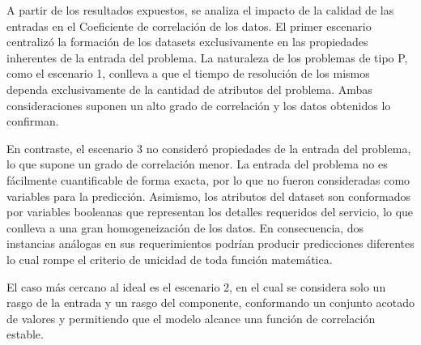A partir de los resultados expuestos, se analiza el impacto de la
calidad de las entradas en el Coeficiente de correlación de los datos.
El primer escenario centralizó la formación de los datasets exclusivamente
en las propiedades inherentes de la entrada del problema. La naturaleza
de los problemas de tipo P, como el escenario 1, conlleva a que el
tiempo de resolución de los mismos dependa exclusivamente de la cantidad
de atributos del problema. Ambas consideraciones suponen un alto grado
de correlación y los datos obtenidos lo confirman.

En contraste, el escenario 3 no consideró propiedades de la entrada
del problema, lo que supone un grado de correlación menor. La entrada
del problema no es fácilmente cuantificable de forma exacta, por lo
que no fueron consideradas como variables para la predicción. Asimismo,
los atributos del dataset son conformados por variables booleanas
que representan los detalles requeridos del servicio, lo que conlleva
a una gran homogeneización de los datos. En consecuencia, dos instancias
análogas en sus requerimientos podrían producir predicciones diferentes
lo cual rompe el criterio de unicidad de toda función matemática.

El caso más cercano al ideal es el escenario 2, en el cual se considera
solo un rasgo de la entrada y un rasgo del componente, conformando
un conjunto acotado de valores y permitiendo que el modelo alcance
una función de correlación estable.

\begin{table}[H]

\caption{Especificaciones de los dispositivos móviles utilizados. \label{tab:RMSE-results}}
\end{table}


